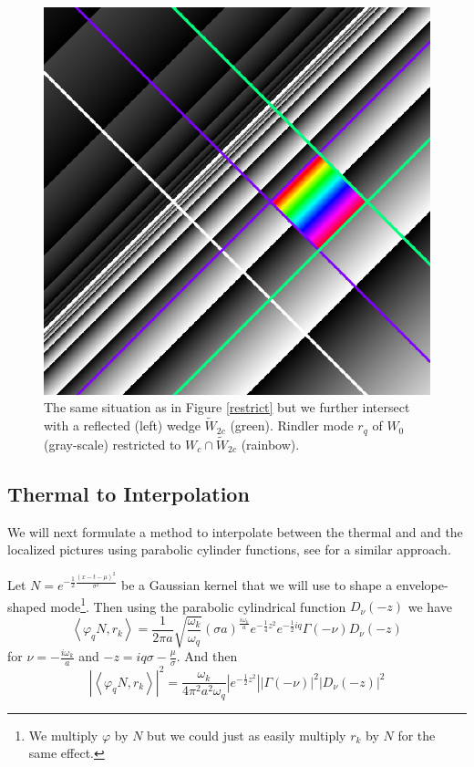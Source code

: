 \documentclass[12pt,a4paper]{article}
\begin{document}
\begin{figure}[h]
  \centering
\includegraphics[scale=0.4]{diamond_in_wedge.png}
\caption{The same situation as in Figure \ref{restrict} but we further intersect with a reflected (left) wedge $\widetilde{W}_{2c}$ (green). Rindler mode $r_q$ of $W_0$ (gray-scale) restricted to $W_c \cap \widetilde{W}_{2c}$ (rainbow).}
\label{diamond}
\end{figure}


\subsection{Thermal to  Interpolation}
We will next formulate a method to interpolate between the thermal and and the localized pictures using parabolic cylinder functions\cite{AbramowitzStegun1964}, see \cite{hashiba2021stokes} for a similar approach.

Let $N = e^{-\frac{1}{2} \frac{(x-t-\mu)^2}{\sigma^2}}$ be a Gaussian kernel that we will use to shape a envelope-shaped mode\footnote{We multiply $\varphi$ by $N$ but we could just as easily multiply $r_k$ by $N$ for the same effect.}. Then using the parabolic cylindrical function $D_\nu(-z)$ we have
\begin{equation}
  \left< \varphi_q N, r_k \right> = \frac{1}{2\pi a} \sqrt{\frac{\omega_k}{\omega_q}} (\sigma a)^\frac{i\omega_k}{a} e^{-\frac{1}{4} z^2} e^{-\frac{1}{2} i q} \Gamma(-\nu) D_\nu(-z)
\end{equation}
for $\nu = -\frac{i \omega_k}{a}$ and $-z = iq\sigma - \frac{\mu}{\sigma}$. And then
\begin{equation}
  \left|\left< \varphi_q N, r_k \right>\right|^2 = \frac{\omega_k}{4\pi^2a^2\omega_q} \left| e^{-\frac{1}{2} z^2} \right| \left| \Gamma(-\nu) \right|^2 \left| D_\nu(-z) \right|^2
\label{pcf}
\end{equation}
\end{document}
